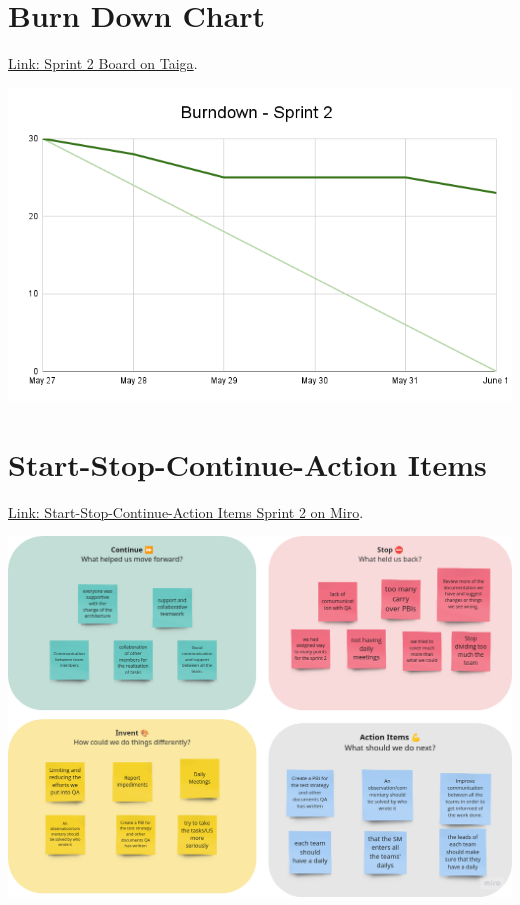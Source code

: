 \documentclass{article}
\begin{document}
\hypertarget{burndownchart-s2}{
\section{Burn Down Chart}\label{Burn Down Chart S2}}
\href{https://tree.taiga.io/project/joseluis-teran-coffeetime/taskboard/sprint-2-12274}{Link: Sprint 2 Board on Taiga}.

\includegraphics[width=\textwidth]{./assets/Burndown - Sprint 2.png}

\hypertarget{startstopcontinueactionitems-s2}{
\section{Start-Stop-Continue-Action Items}\label{Start-Stop-Continue-Action Items S2}}
\href{https://miro.com/app/board/uXjVKDO7l8M=/?moveToWidget=3458764590247693277&cot=14}{Link: Start-Stop-Continue-Action Items Sprint 2 on Miro}.

\includegraphics[width=\textwidth]{./assets/retrospective-s2.png}
\end{document}
